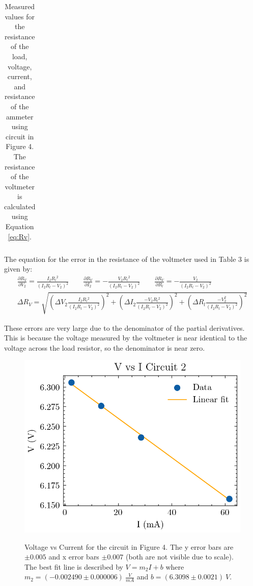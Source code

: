 \documentclass[12pt]{article}
\begin{document}
\begin{table}[H]
\begin{adjustwidth}{-1cm}{}
\begin{tabular}{|l|l|l|l|l|l|l|l|l|lll}
    \end{tabular}
    \end{adjustwidth}
    \label{table:3}
    \caption{Measured values for the resistance of the load, voltage, current, and resistance of the ammeter using circuit in Figure 4. The resistance of the voltmeter is calculated using Equation \ref{eq:Rv}.}
\end{table}

The equation for the error in the resistance of the voltmeter used in Table 3 is given by:
\begin{align}
    \frac{\partial R_V}{\partial V_2} = \frac{I_2R{_l}^2}{(I_2R_l - V_2)^2} \qquad
    \frac{\partial R_V}{\partial I_2} = -\frac{V_2R{_l}^2}{(I_2R_l - V_2)^2} \qquad
    \frac{\partial R_V}{\partial R_l} = -\frac{V_2}{(I_2R_l - V_2)^2} \\
    \Delta R_V = \sqrt{\left(\Delta V_2{\frac{I_2R{_l}^2}{(I_2R_l - V_2)^2}}\right)^2 + \left(\Delta I_2\frac{-V_2R{_l}^2}{(I_2R_l - V_2)^2}\right)^2 + \left(\Delta R_l \frac{-V_2^2}{(I_2R_l - V_2)^2}\right)^2}
    \label{eq:deltaRv}
\end{align}

These errors are very large due to the denominator of the partial derivatives. This is because the voltage measured by the voltmeter is near identical to the voltage across the load resistor, so the denominator is near zero.

\begin{figure}[H]
    \begin{centering}
    \includegraphics[width=0.5 \textwidth]{img/V_vs_I_2.png}
    \label{fig:v_i_c2}
    \caption{Voltage vs Current for the circuit in Figure 4. The y error bars are $\pm 0.005$ and x error bars $\pm 0.007$ (both are not visible due to scale). 
    The best fit line is described by $V = m_2I + b$ where $m_2 = (-0.002490 \pm 0.000006)\ \frac{V}{mA}$ and $b = (6.3098 \pm 0.0021)\ V$.}
    \end{centering}
\end{figure}
\end{document}

